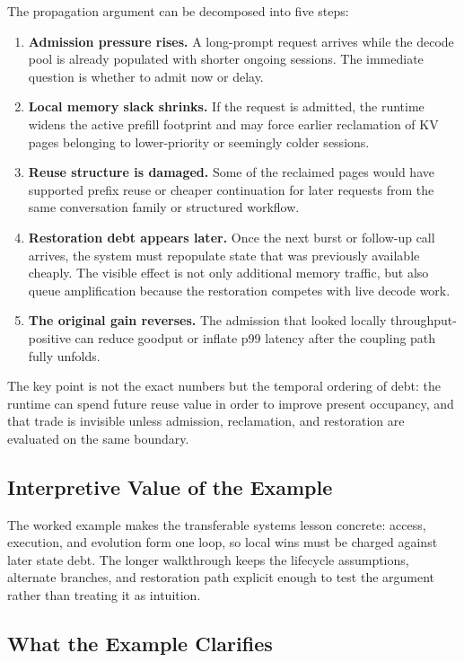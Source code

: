 The propagation argument can be decomposed into five steps:
\begin{enumerate}[leftmargin=*]
\item \textbf{Admission pressure rises.} A long-prompt request arrives while the decode pool is already populated with shorter ongoing sessions. The immediate question is whether to admit now or delay.
\item \textbf{Local memory slack shrinks.} If the request is admitted, the runtime widens the active prefill footprint and may force earlier reclamation of KV pages belonging to lower-priority or seemingly colder sessions.
\item \textbf{Reuse structure is damaged.} Some of the reclaimed pages would have supported prefix reuse or cheaper continuation for later requests from the same conversation family or structured workflow.
\item \textbf{Restoration debt appears later.} Once the next burst or follow-up call arrives, the system must repopulate state that was previously available cheaply. The visible effect is not only additional memory traffic, but also queue amplification because the restoration competes with live decode work.
\item \textbf{The original gain reverses.} The admission that looked locally throughput-positive can reduce goodput or inflate p99 latency after the coupling path fully unfolds.
\end{enumerate}

\begin{quotebox}
The key point is not the exact numbers but the temporal ordering of debt: the runtime can spend future reuse value in order to improve present occupancy, and that trade is invisible unless admission, reclamation, and restoration are evaluated on the same boundary.
\end{quotebox}

\subsection{Interpretive Value of the Example}

The worked example makes the transferable systems lesson concrete: access, execution, and evolution form one loop, so local wins must be charged against later state debt. The longer walkthrough keeps the lifecycle assumptions, alternate branches, and restoration path explicit enough to test the argument rather than treating it as intuition.

\subsection{What the Example Clarifies}

